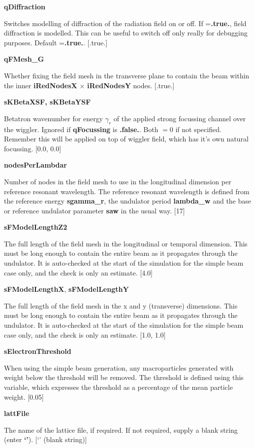 \documentclass[12pt]{article}%
\begin{document}
{\bf qDiffraction}

Switches modelling of diffraction of the radiation field on or off. If ={\bf .true.}, field diffraction is modelled. This can be useful to switch off only really for debugging purposes. Default ={\bf .true.}. [.true.]

{\bf qFMesh\_G}

Whether fixing the field mesh in the transverse plane to contain the beam within the inner {\bf iRedNodesX} $\times$ {\bf iRedNodesY} nodes. [.true.]


{\bf sKBetaXSF, sKBetaYSF}

Betatron wavenumber for energy $\gamma_r$ of the applied strong focussing channel over the wiggler. Ignored if {\bf qFocussing} is {\bf .false.}. Both $=0$ if not specified. Remember this will be applied on top of wiggler field, which has it's own natural focussing. [0.0, 0.0]

{\bf nodesPerLambdar}

Number of nodes in the field mesh to use in the longitudinal dimension per reference resonant wavelength. The reference resonant wavelength is defined from the reference energy {\bf sgamma\_r}, the undulator period {\bf lambda\_w} and the base or reference undulator parameter {\bf saw} in the usual way. [17]

{\bf sFModelLengthZ2}

The full length of the field mesh in the longitudinal or temporal dimension. This must be long enough to contain the entire beam as it propagates through the undulator. It is auto-checked at the start of the simulation for the simple beam case only, and the check is only an estimate. [4.0]

{\bf sFModelLengthX}, {\bf sFModelLengthY}

The full length of the field mesh in the x and y (transverse) dimensions. This must be long enough to contain the entire beam as it propagates through the undulator. It is auto-checked at the start of the simulation for the simple beam case only, and the check is only an estimate. [1.0, 1.0]

{\bf sElectronThreshold}

When using the simple beam generation, any macroparticles generated with weight below the threshold will be removed. The threshold is defined using this variable, which expresses the threshold as a percentage of the mean particle weight. [0.05]

{\bf lattFile}

The name of the lattice file, if required. If not required, supply a blank string (enter {\bf `'}). [`' (blank string)]
\end{document}
